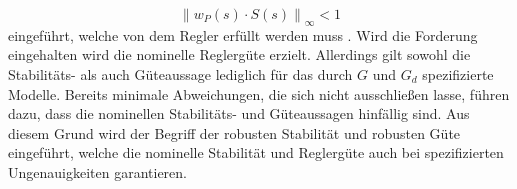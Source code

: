 \begin{equation}
{\lVert w_P(s)\cdot S(s) \rVert}_\infty < 1
\end{equation}
eingeführt, welche von dem Regler erfüllt werden muss \cite[S. 60 ff]{MFC}. Wird die Forderung eingehalten wird die nominelle Reglergüte erzielt. Allerdings gilt sowohl die Stabilitäts- als auch Güteaussage lediglich für das durch $G$ und $G_d$ spezifizierte Modelle. Bereits minimale Abweichungen, die sich nicht ausschließen lasse, führen dazu, dass die nominellen Stabilitäts- und Güteaussagen hinfällig sind. Aus diesem Grund wird der Begriff der robusten Stabilität und robusten Güte eingeführt, welche die nominelle Stabilität und Reglergüte auch bei spezifizierten Ungenauigkeiten garantieren.